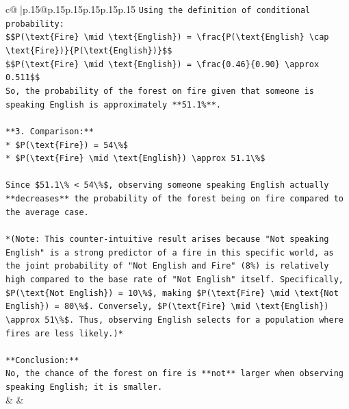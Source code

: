 \documentclass{article}
\begin{document}
{\begin{supertabular}{c@{$\;$}|p{.15\linewidth}@{}p{.15\linewidth}p{.15\linewidth}p{.15\linewidth}p{.15\linewidth}p{.15\linewidth}}
{{{\texttt{Using the definition of conditional probability:} \\
\texttt{\$\$P(\textbackslash{}text\{Fire\} \textbackslash{}mid \textbackslash{}text\{English\}) = \textbackslash{}frac\{P(\textbackslash{}text\{English\} \textbackslash{}cap \textbackslash{}text\{Fire\})\}\{P(\textbackslash{}text\{English\})\}\$\$} \\
\texttt{\$\$P(\textbackslash{}text\{Fire\} \textbackslash{}mid \textbackslash{}text\{English\}) = \textbackslash{}frac\{0.46\}\{0.90\} \textbackslash{}approx 0.511\$\$} \\
\texttt{So, the probability of the forest on fire given that someone is speaking English is approximately **51.1\%**.} \\
\\ 
\texttt{**3. Comparison:**} \\
\texttt{*   \$P(\textbackslash{}text\{Fire\}) = 54\textbackslash{}\%\$} \\
\texttt{*   \$P(\textbackslash{}text\{Fire\} \textbackslash{}mid \textbackslash{}text\{English\}) \textbackslash{}approx 51.1\textbackslash{}\%\$} \\
\\ 
\texttt{Since \$51.1\textbackslash{}\% < 54\textbackslash{}\%\$, observing someone speaking English actually **decreases** the probability of the forest being on fire compared to the average case.} \\
\\ 
\texttt{*(Note: This counter{-}intuitive result arises because "Not speaking English" is a strong predictor of a fire in this specific world, as the joint probability of "Not English and Fire" (8\%) is relatively high compared to the base rate of "Not English" itself. Specifically, \$P(\textbackslash{}text\{Not English\}) = 10\textbackslash{}\%\$, making \$P(\textbackslash{}text\{Fire\} \textbackslash{}mid \textbackslash{}text\{Not English\}) = 80\textbackslash{}\%\$. Conversely, \$P(\textbackslash{}text\{Fire\} \textbackslash{}mid \textbackslash{}text\{English\}) \textbackslash{}approx 51\textbackslash{}\%\$. Thus, observing English selects for a population where fires are less likely.)*} \\
\\ 
\texttt{**Conclusion:**} \\
\texttt{No, the chance of the forest on fire is **not** larger when observing speaking English; it is smaller.} \\
            }
        }
    }
    & & \\ \\


\end{supertabular}}
\end{document}
